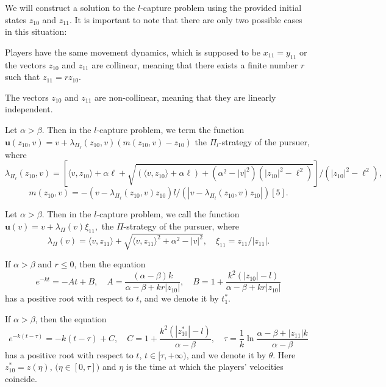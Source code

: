 \documentclass[12pt]{llncs}
\begin{document}
We will construct a solution to the $l$-capture problem using the provided initial states $z_{10}$ and $z_{11}$. It is important to note that there are only two possible cases in this situation:
\begin{case}
Players have the same movement dynamics, which is supposed to be $x_{11}=y_{11}$ or the vectors $z_{10}$ and $z_{11}$ are collinear, meaning that there exists a finite number $r$ such that $z_{11}=r z_{10}$.
\end{case}
\begin{case}
The vectors $z_{10}$ and $z_{11}$ are non-collinear, meaning that they are linearly independent.
\end{case}
\begin{definition}
Let $\alpha>\beta$. Then  in the $l$-capture problem, we term the function \\
$
\textbf{u}(z_{10}, v)=v+\lambda_{\Pi_\ell}(z_{10},v)\left(m(z_{10},v)-z_{10}\right)
$
 the $\Pi_l$-strategy of the pursuer, where
\begin{equation*}
\lambda_{\Pi_\ell}(z_{10}, v)=\left[\langle v, z _{10}\rangle+\alpha \ell+\sqrt{(\langle v, z _{10}\rangle+\alpha \ell)+(\alpha^{2}-|v|^{2})(|z_{10}|^2-\ell^2)}\right]/(|z_{10}|^2-\ell^2),
 \end{equation*}
 $$
 m(z_{10},v)=-(v-\lambda_{\Pi_\ell}(z_{10},v) z_{10}) l/(|v-\lambda_{\Pi_l}(z_{10},v) z_{10}|) [5].
 $$
\end{definition}
\begin{definition}
Let $\alpha>\beta$. Then  in the $l$-capture problem, we call the function \\
$
\textbf{u}(v)=v+\lambda_{\Pi}(v)\xi_{11},
$
the $\Pi$-strategy of the pursuer, where
\begin{equation*}
\lambda_{\Pi}(v)=\langle v, z _{11}\rangle+\sqrt{\langle v, z _{11}\rangle^2+\alpha^{2}-|v|^{2}},\quad \xi_{11}=z _{11}/|z _{11}|.
 \end{equation*}
\end{definition}
\begin{proposition}
If $\alpha>\beta$ and $r\leq0$, then the equation
\begin{equation*}
e^{-kt}=-At+B,\quad A=\frac{(\alpha-\beta)k}{\alpha-\beta+kr|z_{10}|},\quad B=1+\frac{k^2(|z_{10}|-l)}{\alpha-\beta+kr|z_{10}|}
\end{equation*}
has a positive root with respect to $t$, and we denote it by $t^{*}_{1}$.
\end{proposition}

\begin{proposition}
If $\alpha>\beta$, then the equation
\begin{equation*}
e^{-k(t-\tau)}=-k(t-\tau)+C,\quad C=1+\frac{k^2(|z^{*}_{10}|-l)}{\alpha-\beta},\quad \tau=\frac{1}{k}\ln{\frac{\alpha-\beta+|z_{11}|k}{\alpha-\beta}}
\end{equation*}
has a positive root with respect to $t$, $t\in[\tau,+\infty)$, and we denote it by $\theta$. Here $z^{*}_{10}=z(\eta)$, $\big(\eta\in[0,\tau]\big)$ and $\eta$ is the time at which the players' velocities coincide.
\end{proposition}
\end{document}
